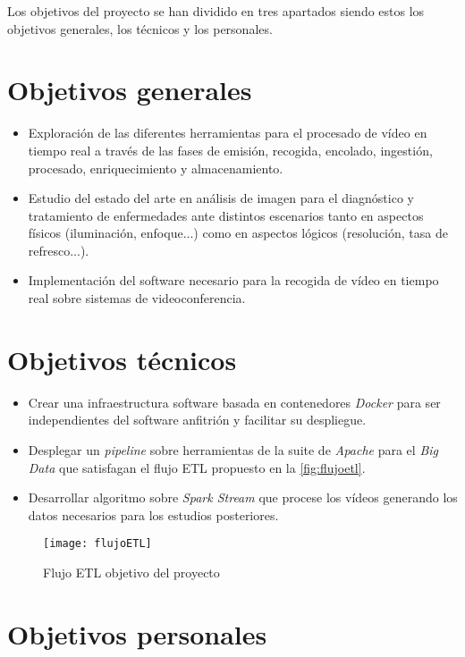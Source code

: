 Los objetivos del proyecto se han dividido en tres apartados siendo estos los objetivos generales, los técnicos y los personales.

\section{Objetivos generales}

\begin{itemize}
	\item Exploración de las diferentes herramientas para el procesado de vídeo en tiempo real a través de las fases de emisión, recogida, encolado, ingestión, procesado, enriquecimiento y almacenamiento.
	\item Estudio del estado del arte en análisis de imagen para el diagnóstico y tratamiento de enfermedades ante distintos escenarios tanto en aspectos físicos (iluminación, enfoque...) como en aspectos lógicos (resolución, tasa de refresco...).
	\item Implementación del software necesario para la recogida de vídeo en tiempo real sobre sistemas de videoconferencia.
\end{itemize}

\section{Objetivos técnicos}

\begin{itemize}
	\item Crear una infraestructura software basada en contenedores \textit{Docker} para ser independientes del software anfitrión y facilitar su despliegue.
	\item Desplegar un \textit{pipeline} sobre herramientas de la suite de \textit{Apache} para el \textit{Big Data} que satisfagan el flujo ETL propuesto en la \autoref{fig:flujoetl}.
	\item Desarrollar algoritmo sobre \textit{Spark Stream} que procese los vídeos generando los datos necesarios para los estudios posteriores. 
\end{itemize}

\begin{figure}
	\centering
	\texttt{[image: flujoETL]}
	\caption{Flujo ETL objetivo del proyecto}
	\label{fig:flujoetl}
\end{figure}


\section{Objetivos personales}


